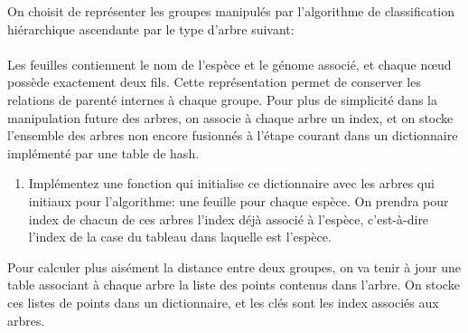 \documentclass[a4paper, 10pt]{article}
\begin{document}
On choisit de représenter les groupes manipulés par l'algorithme de classification hiérarchique ascendante par le type d'arbre suivant:\\
\\
Les feuilles contiennent le nom de l'espèce et le génome associé, et chaque nœud possède exactement deux fils. Cette représentation permet de conserver les relations de parenté internes à chaque groupe. Pour plus de simplicité dans la manipulation future des arbres, on associe à chaque arbre un index, et on stocke l'ensemble des arbres non encore fusionnés à l'étape courant dans un dictionnaire implémenté par une table de hash.
\begin{enumerate}[resume]
\item Implémentez une fonction  qui initialise ce dictionnaire avec les arbres qui initiaux pour l'algorithme: une feuille pour chaque espèce. On prendra pour index de chacun de ces arbres l'index déjà associé à l'espèce, c'est-à-dire l'index de la case du tableau dans laquelle est l'espèce.
\end{enumerate}
Pour calculer plus aisément la distance entre deux groupes, on va tenir à jour une table associant à chaque arbre la liste des points contenus dans l'arbre. On stocke ces listes de points dans un dictionnaire, et les clés sont les index associés aux arbres.
\end{document}
